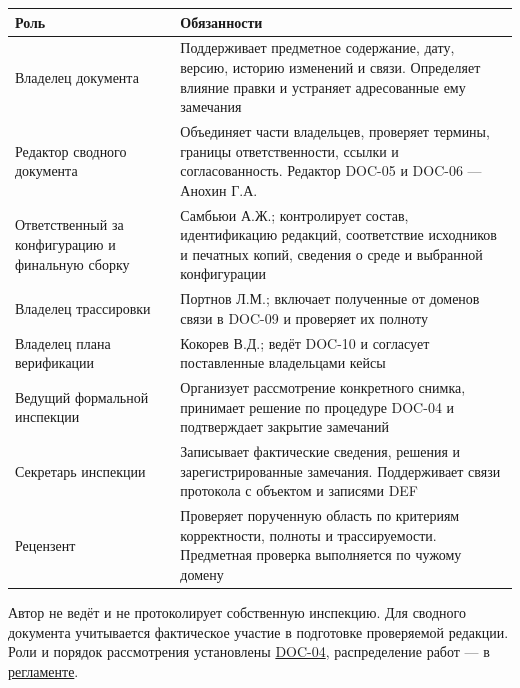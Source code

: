 \documentclass[12pt,a4paper]{article}
\newcounter{none} %
\begin{document}
{\def\LTcaptype{none} %
\begin{longtable}[]{@{}
  >{\raggedright\arraybackslash}p{}
  >{\raggedright\arraybackslash}p{}@{}}
\toprule\noalign{}
\begin{minipage}[b]{\linewidth}\raggedright
Роль
\end{minipage} & \begin{minipage}[b]{\linewidth}\raggedright
Обязанности
\end{minipage} \\
\midrule\noalign{}
\endhead
\bottomrule\noalign{}
\endlastfoot
Владелец документа & Поддерживает предметное содержание, дату, версию, историю изменений и связи. Определяет влияние правки и устраняет адресованные ему замечания \\
Редактор сводного документа & Объединяет части владельцев, проверяет термины, границы ответственности, ссылки и согласованность. Редактор DOC-05 и DOC-06 --- Анохин Г.А. \\
Ответственный за конфигурацию и финальную сборку & Самбьюи А.Ж.; контролирует состав, идентификацию редакций, соответствие исходников и печатных копий, сведения о среде и выбранной конфигурации \\
Владелец трассировки & Портнов Л.М.; включает полученные от доменов связи в DOC-09 и проверяет их полноту \\
Владелец плана верификации & Кокорев В.Д.; ведёт DOC-10 и согласует поставленные владельцами кейсы \\
Ведущий формальной инспекции & Организует рассмотрение конкретного снимка, принимает решение по процедуре DOC-04 и подтверждает закрытие замечаний \\
Секретарь инспекции & Записывает фактические сведения, решения и зарегистрированные замечания. Поддерживает связи протокола с объектом и записями DEF \\
Рецензент & Проверяет порученную область по критериям корректности, полноты и трассируемости. Предметная проверка выполняется по чужому домену \\
\end{longtable}
}

Автор не ведёт и не протоколирует собственную инспекцию. Для сводного документа учитывается фактическое участие в подготовке проверяемой редакции. Роли и порядок рассмотрения установлены {\href{../../06\_Процедура\_формальной\_инспекции/Процедура\_формальной\_инспекции.pdf}{DOC-04}}, распределение работ --- в \href{https://github.com/Kokorev-VD/mephi-samolety/blob/main/base/\%D0\%9F\%D1\%80\%D0\%BE\%D1\%86\%D0\%B5\%D1\%81\%D1\%81\%D1\%8B_\%D0\%B8_\%D0\%BE\%D0\%B1\%D1\%8F\%D0\%B7\%D0\%B0\%D0\%BD\%D0\%BD\%D0\%BE\%D1\%81\%D1\%82\%D0\%B8.md}{регламенте}.
\end{document}

